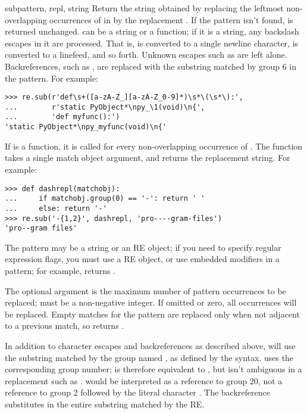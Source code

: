 \begin{funcdesc}{sub}{pattern, repl, string}
  Return the string obtained by replacing the leftmost non-overlapping
  occurrences of  in  by the replacement
  .  If the pattern isn't found,  is returned
  unchanged.   can be a string or a function; if it is a
  string, any backslash escapes in it are processed.  That is,
   is converted to a single newline character, 
  is converted to a linefeed, and so forth.  Unknown escapes such as
   are left alone.  Backreferences, such as , are
  replaced with the substring matched by group 6 in the pattern.  For
  example:

\begin{verbatim}
>>> re.sub(r'def\s+([a-zA-Z_][a-zA-Z_0-9]*)\s*\(\s*\):',
...        r'static PyObject*\npy_\1(void)\n{',
...        'def myfunc():')
'static PyObject*\npy_myfunc(void)\n{'
\end{verbatim}

  If  is a function, it is called for every non-overlapping
  occurrence of .  The function takes a single match
  object argument, and returns the replacement string.  For example:

\begin{verbatim}
>>> def dashrepl(matchobj):
...     if matchobj.group(0) == '-': return ' '
...     else: return '-'
>>> re.sub('-{1,2}', dashrepl, 'pro----gram-files')
'pro--gram files'
\end{verbatim}

  The pattern may be a string or an RE object; if you need to specify
  regular expression flags, you must use a RE object, or use embedded
  modifiers in a pattern; for example,  returns .

  The optional argument  is the maximum number of pattern
  occurrences to be replaced;  must be a non-negative
  integer.  If omitted or zero, all occurrences will be replaced.
  Empty matches for the pattern are replaced only when not adjacent to
  a previous match, so  returns
  .

  In addition to character escapes and backreferences as described
  above,  will use the substring matched by the group
  named , as defined by the  syntax.
   uses the corresponding group number;
   is therefore equivalent to , but isn't
  ambiguous in a replacement such as .  
  would be interpreted as a reference to group 20, not a reference to
  group 2 followed by the literal character .  The
  backreference  substitutes in the entire substring
  matched by the RE.
\end{funcdesc}

